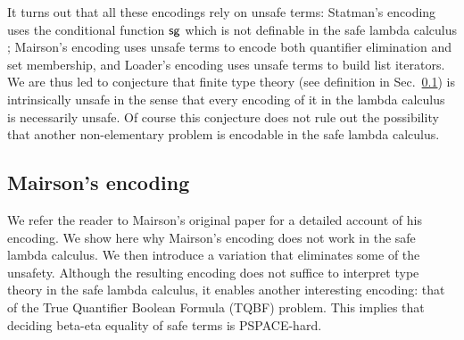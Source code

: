 It turns out that all these encodings rely on unsafe terms:
Statman's encoding uses the conditional function $\sf sg$ which is
not definable in the safe lambda calculus
\cite{blumong:safelambdacalculus}; Mairson's encoding uses unsafe
terms to encode both quantifier elimination and set membership, and
Loader's encoding uses unsafe terms to build list iterators. We are
thus led to conjecture that finite type theory (see definition in
Sec.~\ref{sec:mairsonenc}) is intrinsically unsafe in the sense
that every encoding of it in the lambda calculus is necessarily
unsafe. Of course this conjecture does not rule out the possibility
that another non-elementary problem is encodable in the safe lambda
calculus.


\subsection{Mairson's encoding}
\label{sec:mairsonenc}
We refer the reader to Mairson's original paper \cite{mairson1992spt} for a detailed account of his encoding. We show here why Mairson's encoding does not work in the safe lambda calculus. We then introduce a variation that eliminates some of the unsafety. Although the resulting encoding does not suffice to interpret type theory in the safe lambda calculus, it enables another interesting encoding: that of the True Quantifier Boolean Formula (TQBF) problem. This implies that deciding beta-eta equality of safe terms is PSPACE-hard.

